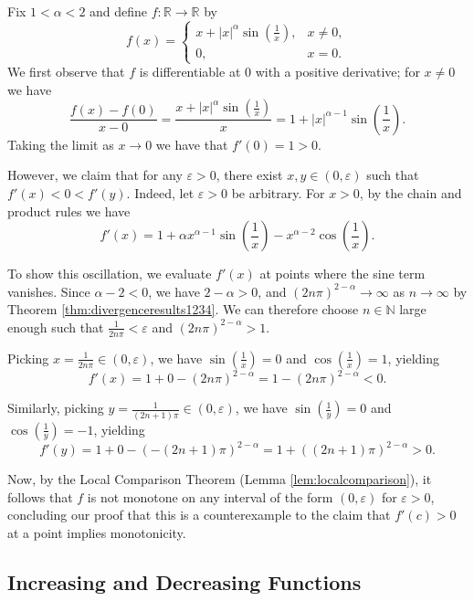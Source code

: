 \documentclass[../analysis1.tex]{subfiles}
\begin{document}
\begin{example}
    Fix $1 < \alpha < 2$ and define $f : \mathbb{R} \to \mathbb{R}$ by
\[
f(x) =
\begin{cases}
x + |x|^\alpha \sin\left(\frac{1}{x}\right), & x \neq 0, \\
0, & x = 0.
\end{cases}
\]
We first observe that $f$ is differentiable at $0$ with a positive derivative; for $x \neq 0$ we have
\[
\frac{f(x) - f(0)}{x - 0} = \frac{x + |x|^\alpha \sin\left(\frac{1}{x}\right)}{x} = 1 + |x|^{\alpha-1} \sin\left(\frac{1}{x}\right).
\]
Taking the limit as $x \to 0$ we have that $f'(0) = 1 > 0$.

However, we claim that for any $\varepsilon > 0$, there exist $x, y \in (0, \varepsilon)$ such that $f'(x) < 0 < f'(y)$. Indeed, let $\varepsilon > 0$ be arbitrary. For $x > 0$, by the chain and product rules we have
\[
f'(x) = 1 + \alpha x^{\alpha-1} \sin\left(\frac{1}{x}\right) - x^{\alpha-2} \cos\left(\frac{1}{x}\right).
\]

To show this oscillation, we evaluate $f'(x)$ at points where the sine term vanishes. Since $\alpha - 2 < 0$, we have $2 - \alpha > 0$, and $(2n\pi)^{2-\alpha} \to \infty$ as $n \to \infty$ by Theorem \ref{thm:divergenceresults1234}. We can therefore choose $n \in \mathbb{N}$ large enough such that $\frac{1}{2n\pi} < \varepsilon$ and $(2n\pi)^{2-\alpha} > 1$.

Picking $x = \frac{1}{2n\pi} \in (0, \varepsilon)$, we have $\sin\left(\frac{1}{x}\right) = 0$ and $\cos\left(\frac{1}{x}\right) = 1$, yielding
\[
f'(x) = 1 + 0 - (2n\pi)^{2-\alpha} = 1 - (2n\pi)^{2-\alpha} < 0.
\]

Similarly, picking $y = \frac{1}{(2n+1)\pi} \in (0, \varepsilon)$, we have $\sin\left(\frac{1}{y}\right) = 0$ and $\cos\left(\frac{1}{y}\right) = -1$, yielding
\[
f'(y) = 1 + 0 - (-(2n+1)\pi)^{2-\alpha} = 1 + ((2n+1)\pi)^{2-\alpha} > 0.
\]

Now, by the Local Comparison Theorem (Lemma \ref{lem:localcomparison}), it follows that $f$ is not monotone on any interval of the form $(0, \varepsilon)$ for $\varepsilon > 0$, concluding our proof that this is a counterexample to the claim that $f'(c) > 0$ at a point implies monotonicity.
\end{example}
   

\subsection{Increasing and Decreasing Functions}
\end{document}
